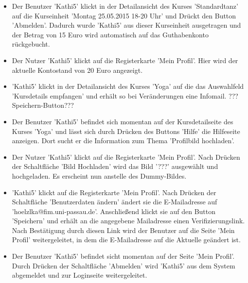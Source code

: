 \documentclass[a4paper]{scrreprt}
\begin{document}
\begin{itemize}
				\item {}
				Der Benutzer 'Kathi5' klickt in der Detailansicht des Kurses 'Standardtanz' auf die Kurseinheit 'Montag 25.05.2015 18-20 Uhr' und Drückt den Button 'Abmelden'. Dadurch wurde 'Kathi5' aus dieser Kurseinheit ausgetragen und der Betrag von 15 Euro wird automatisch auf das Guthabenkonto rückgebucht. 
				
				\item {}
				Der Nutzer 'Kathi5' klickt auf die Registerkarte 'Mein Profil'. Hier wird der aktuelle Kontostand von 20 Euro angezeigt.
				
				\item {}
				'Kathi5' klickt in der Detailansicht des Kurses 'Yoga' auf die das Auswahlfeld 'Kursdetails empfangen' und erhält so bei Veränderungen eine Infomail.  ??? Speichern-Button???
				
				\item {}
				Der Benutzer 'Kathi5' befindet sich momentan auf der Kursdetailseite des Kurses 'Yoga' und lässt sich durch Drücken des Buttons 'Hilfe' die Hilfeseite anzeigen. Dort sucht er die Information zum Thema 'Profilbild hochladen'.
					
				\item {}
				Der Nutzer 'Kathi5' klickt auf die Registerkarte 'Mein Profil'. Nach Drücken der Schaltfläche 'Bild Hochladen' wird das Bild '???' ausgewählt und hochgeladen. Es erscheint nun anstelle des Dummy-Bildes.
				
				\item {}
				'Kathi5' klickt auf die Registerkarte 'Mein Profil'. Nach Drücken der Schaltfläche 'Benutzerdaten ändern' ändert sie die E-Mailadresse auf 'hoelzlka@fim.uni-passau.de'. Anschließend klickt sie auf den Button 'Speichern' und erhält an die angegebene Mailadresse einen Verifizierungslink. Nach Bestätigung durch diesen Link wird der Benutzer auf die Seite 'Mein Profil' weitergeleitet, in dem die E-Mailadresse auf die Aktuelle geändert ist.
				
				\item {}
				Der Benutzer 'Kathi5' befindet sicht momentan auf der Seite 'Mein Profil'. Durch Drücken der Schaltfläche 'Abmelden' wird 'Kathi5' aus dem System abgemeldet und zur Loginseite weitergeleitet.	
					
			\end{itemize}
\end{document}
